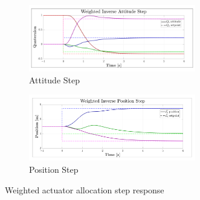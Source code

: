 \begin{figure}[hbtp]
\centering
\begin{subfigure}{\textwidth}
\centering
\includegraphics[width=0.8\textwidth]{graphs/weighted_inverse_attitude}
\vspace{-10pt}
\caption{Attitude Step}
\label{fig:weighted_inverse_attitude}
\end{subfigure}
\begin{subfigure}{\textwidth}
\vspace{-3pt}
\centering
\includegraphics[width=0.8\textwidth]{graphs/weighted_inverse_position}
\vspace{-10pt}
\caption{Position Step}
\label{fig:weighted_inverse_position}
\end{subfigure}
\vspace{-8pt}
\caption{Weighted actuator allocation step response}
\label{fig:weighted-inverse-step}
\vspace{-16pt}
\end{figure}
